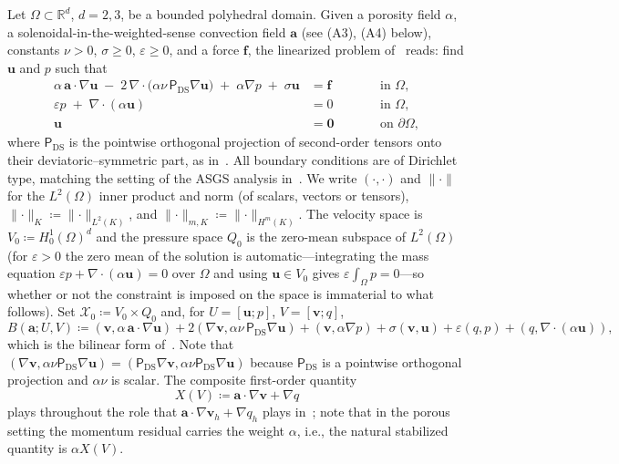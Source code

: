 \documentclass[11pt]{article}
\theoremstyle{remark}
\newcommand{\R}{\mathbb{R}}
\newcommand{\bu}{\boldsymbol{u}}
\newcommand{\bv}{\boldsymbol{v}}
\newcommand{\ba}{\boldsymbol{a}}
\newcommand{\bff}{\boldsymbol{f}}
\newcommand{\ViscProj}{\mathsf{P}_{\mathrm{DS}}}
\newcommand{\norm}[1]{\lVert #1 \rVert}
\newcommand{\normK}[1]{\lVert #1 \rVert_{K}}
\begin{document}
Let $\Omega \subset \R^d$, $d = 2,3$, be a bounded polyhedral domain. Given a porosity
field $\alpha$, a solenoidal-in-the-weighted-sense convection field $\ba$ (see (A3),
(A4) below), constants $\nu > 0$, $\sigma \ge 0$, $\varepsilon \ge 0$, and a force
$\bff$, the linearized problem of~\cite{companion} reads: find $\bu$ and $p$ such that
\begin{subequations}
\label{eq:StrongProblem}
\begin{alignat}{2}
  \alpha\,\ba\cdot\nabla\bu
  \;-\; 2\,\nabla\cdot\bigl(\alpha\nu\,\ViscProj\nabla\bu\bigr)
  \;+\; \alpha\nabla p
  \;+\; \sigma\bu
  &= \bff
  &\qquad& \text{in } \Omega,
  \label{eq:StrongMomentum}\\
  \varepsilon p \;+\; \nabla\cdot(\alpha\bu) &= 0
  && \text{in } \Omega,
  \label{eq:StrongMass}\\
  \bu &= \boldsymbol{0} && \text{on } \partial\Omega,
  \label{eq:StrongBC}
\end{alignat}
\end{subequations}
where $\ViscProj$ is the pointwise orthogonal projection of second-order tensors onto
their deviatoric--symmetric part, as in~\cite{companion}. All boundary conditions are of
Dirichlet type, matching the setting of the ASGS analysis in~\cite{companion}. We write
$(\cdot,\cdot)$ and $\norm{\cdot}$ for the $L^2(\Omega)$ inner product and norm
(of scalars, vectors or tensors), $\normK{\cdot} \coloneqq \norm{\cdot}_{L^2(K)}$, and
$\norm{\cdot}_{m,K} \coloneqq \norm{\cdot}_{H^m(K)}$. The velocity space is
$V_0 \coloneqq H_0^1(\Omega)^d$ and the pressure space $Q_0$ is the zero-mean subspace
of $L^2(\Omega)$ (for $\varepsilon > 0$ the zero mean of the solution is automatic---integrating
the mass equation $\varepsilon p + \nabla\cdot(\alpha\bu) = 0$ over $\Omega$ and using
$\bu \in V_0$ gives $\varepsilon\int_\Omega p = 0$---so whether or not the constraint is imposed
on the space is immaterial to what follows). Set $\mathcal{X}_0 \coloneqq V_0\times Q_0$ and, for
$U = [\bu; p]$, $V = [\bv; q]$,
\begin{equation}
  \label{eq:GalerkinForm}
  B(\ba; U, V)
  \coloneqq
  (\bv, \alpha\,\ba\cdot\nabla\bu)
  + 2(\nabla\bv, \alpha\nu\,\ViscProj\nabla\bu)
  + (\bv, \alpha\nabla p)
  + \sigma(\bv, \bu)
  + \varepsilon(q, p)
  + (q, \nabla\cdot(\alpha\bu)),
\end{equation}
which is the bilinear form of~\cite{companion}. Note that
$(\nabla\bv, \alpha\nu\ViscProj\nabla\bu) = (\ViscProj\nabla\bv, \alpha\nu\ViscProj\nabla\bu)$
because $\ViscProj$ is a pointwise orthogonal projection and $\alpha\nu$ is scalar.
The composite first-order quantity
\begin{equation}
  \label{eq:Xdef}
  X(V) \coloneqq \ba\cdot\nabla\bv + \nabla q
\end{equation}
plays throughout the role that $\ba\cdot\nabla\bv_h + \nabla q_h$ plays
in~\cite{Codina2008}; note that in the porous setting the momentum residual carries the
weight $\alpha$, i.e., the natural stabilized quantity is $\alpha X(V)$.
\end{document}
